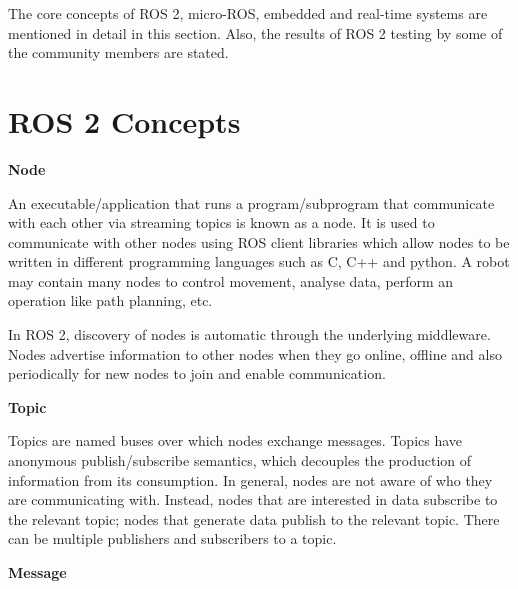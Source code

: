 \documentclass[%
xelatex,
	oneside,		%
	12pt,			%
	parskip=half,	%
	abstracton,
	chapterprefix=true%
    appendixprefix=true]
{scrbook}
\begin{document}
The core concepts of ROS 2, micro-ROS, embedded and real-time systems are mentioned in detail in this section. Also, the results of ROS 2 testing by some of the community members are stated.
	\section{ROS 2 Concepts}
	
	\vspace*{0.5cm}
	{\bfseries Node}
	
	
	\vspace*{0.5cm}
An executable/application that runs a program/subprogram that communicate with each other via streaming topics is known as a node.
It is used to communicate with other nodes using ROS client libraries which allow nodes to be written in different programming languages such as C, C++ and python. A robot may contain many nodes to control movement, analyse data, perform an operation like path planning, etc. 

In ROS 2, discovery of nodes is automatic through the underlying middleware. Nodes advertise information to other nodes when they go online, offline and also periodically for new nodes to join and enable communication. 


\vspace*{0.5cm}
	{\bfseries Topic}
	
	
	\vspace*{0.5cm}
	Topics are named buses over which nodes exchange messages. Topics have anonymous publish/subscribe semantics, which decouples the production of information from its consumption. In general, nodes are not aware of who they are communicating with. Instead, nodes that are interested in data subscribe to the relevant topic; nodes that generate data publish to the relevant topic. There can be multiple publishers and subscribers to a topic.\cite{topic}
	
	\vspace*{0.5cm}
	{\bfseries Message}
	
\end{document}

